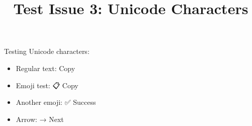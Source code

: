 \documentclass{article}
\begin{document}
\title{Test Issue 3: Unicode Characters}
\maketitle

Testing Unicode characters:
\begin{itemize}
    \item Regular text: Copy
    \item Emoji test: 📋 Copy
    \item Another emoji: ✅ Success
    \item Arrow: → Next
\end{itemize}
\end{document}
